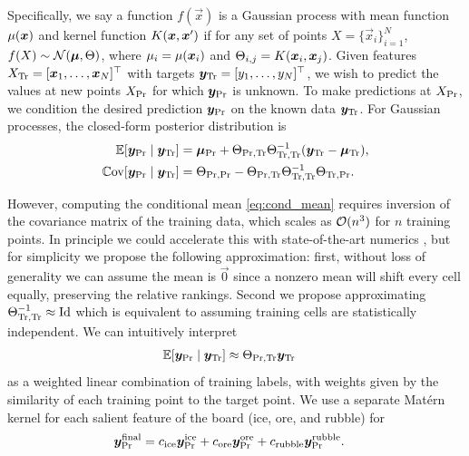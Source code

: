 \documentclass[10pt,twocolumn,letterpaper]{article}
\begin{document}
Specifically, we say a function \( f(\vec{x}) \) is a Gaussian process with
mean function \( \mu(\bm{x}) \) and kernel function \( K(\bm{x}, \bm{x}')
\) if for any set of points \( X = \{ \vec{x}_i \}_{i = 1}^N \), \( f(X) \sim
\mathcal{N}(\bm{\mu}, \Theta) \), where \( \mu_i = \mu(\bm{x}_i) \) and \( \Theta_{i,
j} = K(\bm{x}_i, \bm{x}_j) \).
Given features \( X_{\text{Tr}} = [\bm{x}_1, \dotsc, \bm{x}_N]^{\top}
\) with targets \( \bm{y}_{\text{Tr}} = [y_1, \dotsc, y_N]^{\top} \), we
wish to predict the values at new points \( X_{\text{Pr}} \) for which \(
\bm{y}_{\text{Pr}} \) is unknown.
To make predictions at \( X_{\text{Pr}} \), we condition the desired
prediction \( \bm{y}_{\text{Pr}} \) on the known data \( \bm{y}_{\text{Tr}} \).
For Gaussian processes, the closed-form posterior distribution is
\begin{align}
  \label{eq:cond_mean}
  \operatorname{\mathbb{E}}[\bm{y}_{\text{Pr}} \mid \bm{y}_{\text{Tr}}] &=
    \bm{\mu}_{\text{Pr}} +
    \Theta_{\text{Pr}, \text{Tr}} \Theta_{\text{Tr}, \text{Tr}}^{-1}
    (\bm{y}_{\text{Tr}} - \bm{\mu}_{\text{Tr}}), \\
  \label{eq:cond_cov}
  \operatorname{\mathbb{C}ov}[\bm{y}_{\text{Pr}} \mid \bm{y}_{\text{Tr}}] &=
    \Theta_{\text{Pr}, \text{Pr}} -
    \Theta_{\text{Pr}, \text{Tr}} \Theta_{\text{Tr}, \text{Tr}}^{-1}
    \Theta_{\text{Tr}, \text{Pr}}.
\end{align}

However, computing the conditional mean \eqref{eq:cond_mean} requires inversion
of the covariance matrix of the training data, which scales as \( \mathcal{O}(n^3)
\) for \( n \) training points. In principle we could accelerate this with
state-of-the-art numerics \cite{schafer2021sparse}, but for simplicity we
propose the following approximation: first, without loss of generality we can
assume the mean is \( \vec{0} \) since a nonzero mean will shift every cell
equally, preserving the relative rankings. Second we propose approximating \(
\Theta_{\text{Tr}, \text{Tr}}^{-1} \approx \text{Id} \) which is equivalent to assuming
training cells are statistically independent. We can intuitively
interpret
\begin{align}
  \label{eq:simp_mean}
  \operatorname{\mathbb{E}}[\bm{y}_{\text{Pr}} \mid \bm{y}_{\text{Tr}}] &\approx
    \Theta_{\text{Pr}, \text{Tr}} \bm{y}_{\text{Tr}}
\end{align}
as a weighted linear combination of training labels, with weights
given by the similarity of each training point to the target point.
We use a separate Mat{\'e}rn kernel for each salient
feature of the board (ice, ore, and rubble) for
\begin{align}
  \label{eq:kernel_pred}
  \bm{y}_{\text{Pr}}^{\text{final}} &=
    c_{\text{ice}} \bm{y}_{\text{Pr}}^{\text{ice}}
    + c_{\text{ore}} \bm{y}_{\text{Pr}}^{\text{ore}}
    + c_{\text{rubble}} \bm{y}_{\text{Pr}}^{\text{rubble}}.
\end{align}
\end{document}
